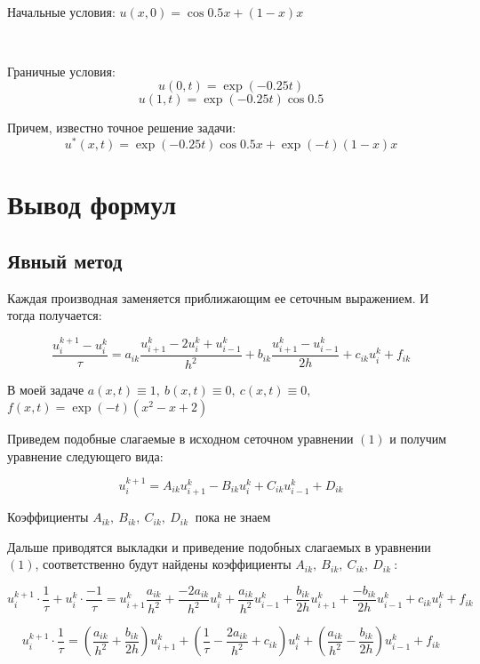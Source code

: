 \documentclass[12pt,a4paper]{article}
\begin{document}
\

Начальные условия: $ \displaystyle u(x,0) = \cos 0.5x + (1-x)x$

\

Граничные условия:
$$ u(0,t) = \exp(-0.25t) $$
$$ u(1,t) = \exp(-0.25t) \cos 0.5 $$

Причем, известно точное решение задачи:
$$
 \displaystyle u^*(x,t) = 
 \exp(-0.25t) \cos 0.5x + \exp(-t) (1-x)x
$$

\section{Вывод формул}

\subsection{Явный метод}

Каждая производная заменяется приближающим ее сеточным выражением. И тогда получается:


\begin{equation} 
 \frac{u_i^{k+1} - u_i^k}{\tau} = 
 a_{ik} \frac{u_{i+1}^k - 2u_i^k + u_{i-1}^k}{h^2} +
 b_{ik} \frac{u_{i+1}^k-u_{i-1}^k}{2h} + 
 c_{ik} u_i^k + f_{ik}
\end{equation}

В моей задаче $a(x,t) \equiv 1, \ b(x,t) \equiv 0, \ c(x,t) \equiv 0, \ $
$ f(x,t) = \exp(-t)(x^2 - x + 2)  $

Приведем подобные слагаемые в исходном сеточном уравнении $(1)$ и получим уравнение следующего вида:

\begin{equation}
 u_i^{k+1} = A_{ik} u_{i+1}^k - B_{ik} u_i^k + C_{ik} u_{i-1}^k + D_{ik}
\end{equation}


Коэффициенты $A_{ik},\ B_{ik},\ C_{ik},\ D_{ik}\ $ пока не знаем

Дальше приводятся выкладки и приведение подобных слагаемых в уравнении $(1)$, соответственно будут найдены коэффициенты $A_{ik},\ B_{ik},\ C_{ik},\ D_{ik}\ $:

$$
 u_i^{k+1} \cdot \frac{1}{\tau} + u_i^k \cdot \frac{-1}{\tau} =
 u_{i+1}^k \frac{a_{ik}}{h^2} + \frac{-2a_{ik}}{h^2} u_i^k + 
 \frac{a_{ik}}{h^2} u_{i-1}^k + \frac{b_{ik}}{2h} u_{i+1}^k +
 \frac{-b_{ik}}{2h} u_{i-1}^k + c_{ik} u_i^k + f_{ik}
$$

$$
 u_i^{k+1} \cdot \frac{1}{\tau} =
 \left ( 
  \frac{a_{ik}}{h^2} + \frac{b_{ik}}{2h}
 \right )
 u_{i+1}^k
 +
 \left (
  \frac{1}{\tau} - \frac{2a_{ik}}{h^2} + c_{ik}
 \right )
 u_i^k
 +
 \left (
  \frac{a_{ik}}{h^2} - \frac{b_{ik}}{2h}
 \right )
 u_{i-1}^k
 + f_{ik}
$$
\end{document}
